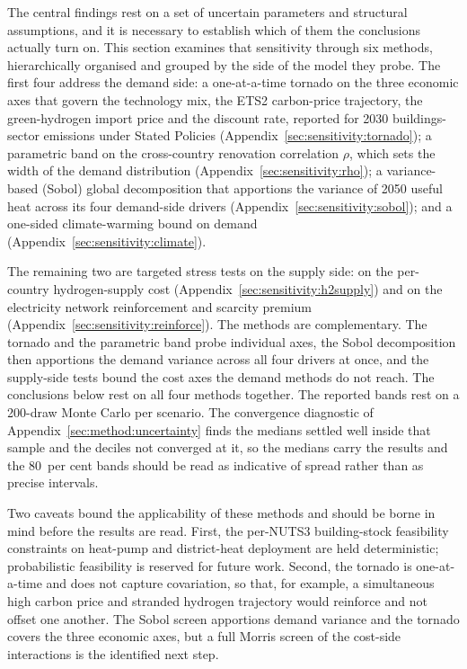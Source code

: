 \label{sec:sensitivity}

The central findings rest on a set of uncertain parameters and structural assumptions,
and it is necessary to establish which of them the conclusions actually turn on. This
section examines that sensitivity through six methods, hierarchically organised and
grouped by the side of the model they probe. The first four address the demand side: a
one-at-a-time tornado on the three economic axes that govern the technology mix, the
ETS2 carbon-price trajectory, the green-hydrogen import price and the discount rate,
reported for 2030 buildings-sector emissions under Stated Policies
(Appendix~\ref{sec:sensitivity:tornado}); a parametric band on the cross-country
renovation correlation $\rho$, which sets the width of the demand distribution
(Appendix~\ref{sec:sensitivity:rho}); a variance-based (Sobol) global decomposition that
apportions the variance of 2050 useful heat across its four demand-side drivers
(Appendix~\ref{sec:sensitivity:sobol}); and a one-sided climate-warming bound on demand
(Appendix~\ref{sec:sensitivity:climate}).

The remaining two are targeted stress tests on the supply side: on the per-country
hydrogen-supply cost (Appendix~\ref{sec:sensitivity:h2supply}) and on the electricity
network reinforcement and scarcity premium (Appendix~\ref{sec:sensitivity:reinforce}).
The methods are complementary. The tornado and the parametric band probe individual
axes, the Sobol decomposition then apportions the demand variance across all four
drivers at once, and the supply-side tests bound the cost axes the demand methods do not
reach. The conclusions below rest on all four methods together. The
reported bands rest on a 200-draw Monte Carlo per scenario. The convergence diagnostic
of Appendix~\ref{sec:method:uncertainty} finds the medians settled well inside that
sample and the deciles not converged at it, so the medians carry the results and the
80~per cent bands should be read as indicative of spread rather than as precise
intervals.

Two caveats bound the applicability of these methods and should be borne in mind
before the results are read. First, the per-NUTS3 building-stock feasibility
constraints on heat-pump and district-heat deployment are held deterministic;
probabilistic feasibility is reserved for future work. Second, the tornado is
one-at-a-time and does not capture covariation, so that, for example, a
simultaneous high carbon price and stranded hydrogen trajectory would reinforce and not offset one another. The Sobol screen apportions demand variance and
the tornado covers the three economic axes, but a full Morris screen of the
cost-side interactions is the identified next step.

